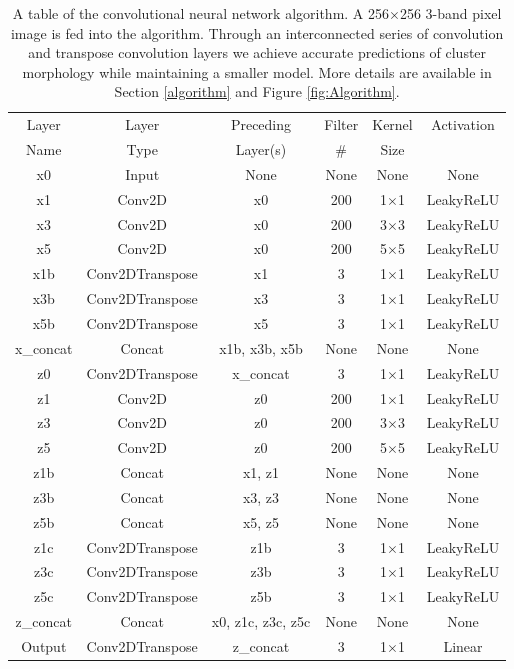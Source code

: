 \begin{table}%
\centering
\setlength\tabcolsep{0pt}
 \begin{tabular*}{\linewidth}{@{\extracolsep{\fill}}||c c c c c c||} 
 \hline
 Layer & Layer & Preceding & Filter & Kernel & Activation \\
 Name & Type & Layer(s) & \# & Size & \\ [0.5ex]
 \hline\hline
 x0 & Input & None & None & None & None \\ 
 x1 & Conv2D & x0 & 200 & 1$\times$1 & LeakyReLU\\
 x3 & Conv2D & x0 & 200 & 3$\times$3 & LeakyReLU\\
 x5 & Conv2D & x0 & 200 & 5$\times$5 & LeakyReLU\\
 x1b & Conv2DTranspose & x1 & 3 & 1$\times$1 & LeakyReLU\\ 
 x3b & Conv2DTranspose & x3 & 3 & 1$\times$1 & LeakyReLU\\
 x5b & Conv2DTranspose & x5 & 3 & 1$\times$1 & LeakyReLU\\
 x\_concat & Concat & x1b, x3b, x5b & None & None & None\\
 z0 & Conv2DTranspose & x\_concat & 3 & 1$\times$1 & LeakyReLU\\
 z1 & Conv2D & z0 & 200 & 1$\times$1 & LeakyReLU\\
 z3 & Conv2D & z0 & 200 & 3$\times$3 & LeakyReLU\\
 z5 & Conv2D & z0 & 200 & 5$\times$5 & LeakyReLU\\
 z1b & Concat & x1, z1 & None & None & None\\ 
 z3b & Concat & x3, z3 & None & None & None\\
 z5b & Concat & x5, z5 & None & None & None\\
 z1c & Conv2DTranspose & z1b & 3 & 1$\times$1 & LeakyReLU\\ 
 z3c & Conv2DTranspose & z3b & 3 & 1$\times$1 & LeakyReLU\\
 z5c & Conv2DTranspose & z5b & 3 & 1$\times$1 & LeakyReLU\\
 z\_concat & Concat & x0, z1c, z3c, z5c & None & None & None\\ 
 Output & Conv2DTranspose & z\_concat & 3 & 1$\times$1 & Linear\\[1ex] %
 \hline
 \end{tabular*}
 \caption{\label{tab:algorithm_breakdown}A table of the convolutional neural network algorithm. A 256$\times$256 3-band pixel image is fed into the algorithm. Through an interconnected series of convolution and transpose convolution layers we achieve accurate predictions of cluster morphology while maintaining a smaller model. More details are available in Section \ref{algorithm} and Figure \ref{fig:Algorithm}.}
\end{table}

